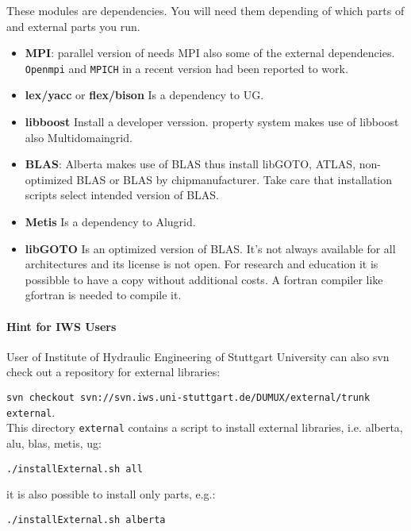 These modules are dependencies. You will need them depending of which parts of \Dune and external parts you run.
\begin{itemize}
\item \textbf{MPI}: parallel version of \Dune needs MPI also some of the external dependencies. \texttt{Openmpi} and \texttt{MPICH} in a recent version had been reported to work. 

\item \textbf{lex/yacc} or \textbf{flex/bison} Is a dependency to UG.

\item \textbf{libboost} Install a developer verssion. \Dumux property system makes use of libboost also \Dune Multidomaingrid.

\item \textbf{BLAS}: Alberta makes use of BLAS thus install libGOTO, ATLAS, non-optimized BLAS or BLAS by chipmanufacturer. Take care that installation scripts select intended version of BLAS. 

\item \textbf{Metis} Is a dependency to Alugrid.
\item \textbf{libGOTO} Is an optimized version of BLAS. It's not always available for all architectures and 
its license is not open. For research and education it is possibble to have a copy without additional costs.
A fortran compiler like gfortran is needed to compile it.
\end{itemize}

\paragraph{Hint for IWS Users} User of Institute of Hydraulic Engineering of Stuttgart University 
can also svn check out a repository for external libraries: 

\texttt{svn checkout svn://svn.iws.uni-stuttgart.de/DUMUX/external/trunk external}. \\

This directory \texttt{external} contains a script to install external libraries, i.e. 
alberta, alu, blas, metis, ug: 
\begin{center}
\texttt{./installExternal.sh all}
\end{center}
it is also possible to install only parts, e.g.:\\ 
\begin{center}
\texttt{./installExternal.sh alberta}
\end{center}


